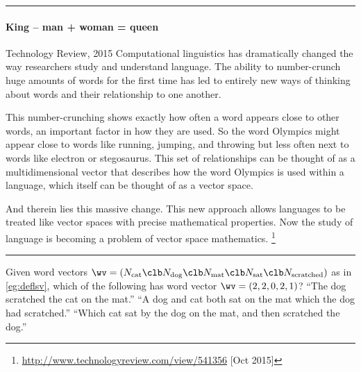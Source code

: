 \begin{table}
\hrule
\begin{minipage}{\linewidth}
\paragraph{King -- man + woman = queen}
\begin{quoted}{Technology Review, 2015}
Computational linguistics has dramatically changed the way researchers study and understand language. 
The ability to number-crunch huge amounts of words for the first time has led to entirely new ways of thinking about words and their relationship to one another.

This number-crunching shows exactly how often a word appears close to other words, an important factor in how they are used. 
So the word Olympics might appear close to words like running, jumping, and throwing but less often next to words like electron or stegosaurus.  
This set of relationships can be thought of as a multidimensional vector that describes how the word Olympics is used within a language, which itself can be thought of as a vector space.  

And therein lies this massive change. 
This new approach allows languages to be treated like vector spaces with precise mathematical properties. 
Now the study of language is becoming a problem of vector space mathematics.
\footnote{\url{http://www.technologyreview.com/view/541356} [Oct 2015]}
\end{quoted}
\end{minipage}
\hrule
\end{table}




\begin{activity}
Given word vectors \(\wv=(N_{\text{cat}}\clb N_{\text{dog}}\clb N_{\text{mat}}\clb N_{\text{sat}}\clb N_{\text{scratched}})\) as in \autoref{eg:deflsv},
which of the following has word vector \(\wv=(2,2,0,2,1)\)?
{``The dog scratched the cat on the mat.''}
{``A dog and cat both sat on the mat which the dog had scratched.''}
{``Which cat sat by the dog on the mat, and then scratched the dog.''}
\end{activity}







